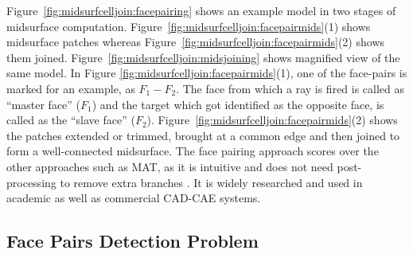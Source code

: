 Figure~\ref{fig:midsurfcelljoin:facepairing} shows an example model in two stages of midsurface computation. Figure~\ref{fig:midsurfcelljoin:facepairmids}(1) shows midsurface patches whereas Figure~\ref{fig:midsurfcelljoin:facepairmids}(2) shows them joined. Figure~\ref{fig:midsurfcelljoin:midsjoining} shows magnified view of the same model. In Figure \ref{fig:midsurfcelljoin:facepairmids}(1), one of the face-pairs is marked for an example, as $F_1-F_2$. The face from which a ray is fired is called as ``master face'' ($F_1$) and the target which got identified as the opposite face, is called as the ``slave face'' ($F_2$). Figure~\ref{fig:midsurfcelljoin:facepairmids}(2) shows the patches extended or trimmed, brought at a common edge and then joined to form a well-connected midsurface. 
 The face pairing approach scores over the other approaches such as MAT, as it is intuitive and does not need post-processing to remove extra branches \cite{Rezayat1996}. It is widely researched and used in academic as well as commercial CAD-CAE systems.


	
\subsection{Face Pairs Detection Problem}  \label{sec:midsurfcelljoin:facepairdetection}


